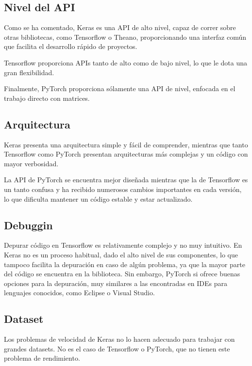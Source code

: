 \subsection{Nivel del API}\label{nivel-del-api}

Como se ha comentado, Keras es una API de alto nivel, capaz de correr
sobre otras bibliotecas, como Tensorflow o Theano, proporcionando una
interfaz común que facilita el desarrollo rápido de proyectos.

Tensorflow proporciona APIs tanto de alto como de bajo nivel, lo que le
dota una gran flexibilidad.

Finalmente, PyTorch proporciona sólamente una API de nivel, enfocada en
el trabajo directo con matrices.

\subsection{Arquitectura}\label{arquitectura}

Keras presenta una arquitectura simple y fácil de comprender, mientras
que tanto Tensorflow como PyTorch presentan arquitecturas más complejas
y un código con mayor verbosidad.

La API de PyTorch se encuentra mejor diseñada mientras que la de
Tensorflow es un tanto confusa y ha recibido numerosos cambios
importantes en cada versión, lo que dificulta mantener un código estable
y estar actualizado.

\subsection{Debuggin}\label{debuggin}

Depurar código en Tensorflow es relativamente complejo y no muy
intuitivo. En Keras no es un proceso habitual, dado el alto nivel de sus
componentes, lo que tampoco facilita la depuración en caso de algún
problema, ya que la mayor parte del código se encuentra en la biblioteca.
Sin embargo, PyTorch si ofrece buenas opciones para la depuración, muy
similares a las encontradas en IDEs para lenguajes conocidos, como
Eclipse o Visual Studio.

\subsection{Dataset}\label{dataset}

Los problemas de velocidad de Keras no lo hacen adecuado para trabajar
con grandes datasets. No es el caso de Tensorflow o PyTorch, que no
tienen este problema de rendimiento.


